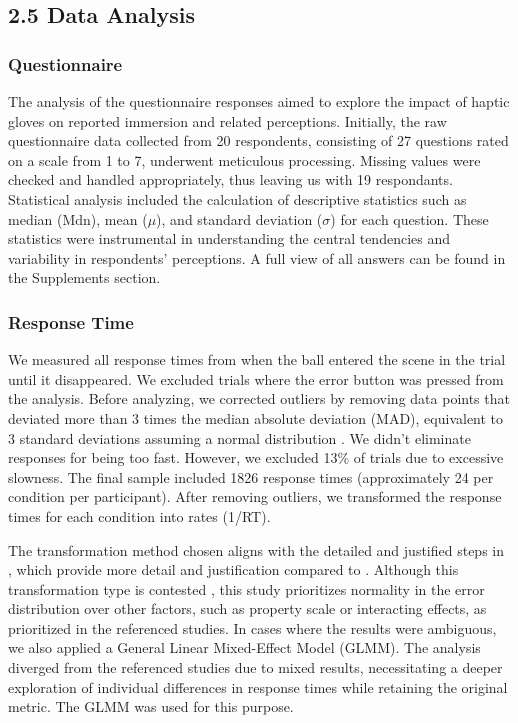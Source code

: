 \documentclass[12pt,oneside,openright]{report}
\begin{document}
\subsection*{2.5 Data Analysis}

\subsubsection*{Questionnaire}
The analysis of the questionnaire responses aimed to explore the impact of haptic gloves on reported immersion and related perceptions. Initially, the raw questionnaire data collected from 20 respondents, consisting of 27 questions rated on a scale from 1 to 7, underwent meticulous processing. Missing values were checked and handled appropriately, thus leaving us with 19 respondants. Statistical analysis included the calculation of descriptive statistics such as median ($\text{Mdn}$), mean ($\mu$), and standard deviation ($\sigma$) for each question. These statistics were instrumental in understanding the central tendencies and variability in respondents' perceptions. A full view of all answers can be found in the Supplements section. 

\subsubsection*{Response Time}
We measured all response times from when the ball entered the scene in the trial until it disappeared. We excluded trials where the error button was pressed from the analysis. Before analyzing, we corrected outliers by removing data points that deviated more than 3 times the median absolute deviation (MAD), equivalent to 3 standard deviations assuming a normal distribution \parencite{Innes2019ACA}. We didn't eliminate responses for being too fast. However, we excluded 13\% of trials due to excessive slowness. The final sample included 1826 response times (approximately 24 per condition per participant). After removing outliers, we transformed the response times for each condition into rates (1/RT).

The transformation method chosen aligns with the detailed and justified steps in \cite{Innes2019ACA}, which provide more detail and justification compared to \cite{SALTAFOSSI2023108642}. Although this transformation type is contested \parencite{Lo2015-fv}, this study prioritizes normality in the error distribution over other factors, such as property scale or interacting effects, as prioritized in the referenced studies. In cases where the results were ambiguous, we also applied a General Linear Mixed-Effect Model (GLMM). The analysis diverged from the referenced studies due to mixed results, necessitating a deeper exploration of individual differences in response times while retaining the original metric. The GLMM was used for this purpose.
\end{document}
